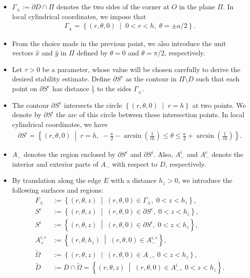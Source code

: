 ﻿\documentclass[11pt,reqno,oneside]{amsart}
\theoremstyle{definition}
\theoremstyle{remark}
\newcommand{\setdef}[2]{\left\lbrace {#1} \; \middle| \; {#2} \right\rbrace}
\renewcommand{\t}{\theta}
\newcommand{\p}{\partial}
\renewcommand{\O}{\Omega}
\newcommand{\ds}{\displaystyle}
\begin{document}
        \begin{itemize}
            \item $\Gamma_{\pm}:=\p D \cap \Pi$ denotes the two sides of the corner at $O$ in the plane $\Pi$. In local cylindrical coordinates, we impose that
            \begin{align*}
                \Gamma_{\pm}=\setdef{(r,\t,0)}{0<r<h,\; \t=\pm a/2}.
            \end{align*}
            \item From the choice made in the previous point, we also introduce the unit vectors $\hat{x}$ and $\hat{y}$ in $\Pi$ defined by $\t=0$ and $\t=\pi/2$, respectively.
            \item Let $\tau>0$ be a parameter, whose value will be chosen carefully to derive the desired stability estimate. Define $\p S^e$ as the contour in $\Pi \setminus D$ such that each point on $\p S^e$ has distance $\ds \frac{1}{\tau}$ to the sides $\Gamma_{\pm}$.
            \item The contour $\p S^e$ intersects the circle $\setdef{(r,\t,0)}{r=h}$ at two points. We denote by $\p S^i$ the arc of this circle between these intersection points. In local cylindrical coordinates, we have
            \begin{align*}
                 \p S^i=\setdef{(r,\t,0)}{r=h,\; -\frac{a}{2}-\arcsin(\frac{1}{\tau h})\leq \t\leq \frac{a}{2}+\arcsin(\frac{1}{\tau h})}.
            \end{align*} 
            \item $A_-$ denotes the region enclosed by $\p S^e$ and $\p S^i$. Also, $A_-^i$ and $A_-^e$ denote the interior and exterior parts of $A_-$ with respect to $D$, respectively.
            \item By translation along the edge $E$ with a distance $h_z>0$, we introduce the following surfaces and regions:
            \begin{align*}
                F_\pm &:=\setdef{(r,\t,z)}{(r,\t,0)\in \Gamma_\pm, \; 0<z<h_z},\\
                S^e &:=\setdef{(r,\t,z)}{(r,\t,0)\in \p S^e, \; 0<z<h_z},\\
                S^i &:=\setdef{(r,\t,z)}{(r,\t,0)\in \p S^i, \; 0<z<h_z},\\
                A_+^{i,e} &:=\setdef{(r,\t,h_z)}{(r,\t,0)\in A_-^{i,e}},\\
                \widetilde{\O}&:=\setdef{(r,\t,z)}{(r,\t,0)\in A_-, \; 0<z<h_z},\\
                \widetilde{D}&:=D\cap \widetilde{\O}=\setdef{(r,\t,z)}{(r,\t,0)\in A_-^i, \; 0<z<h_z}.

\end{align*}
\end{itemize}
\end{document}
